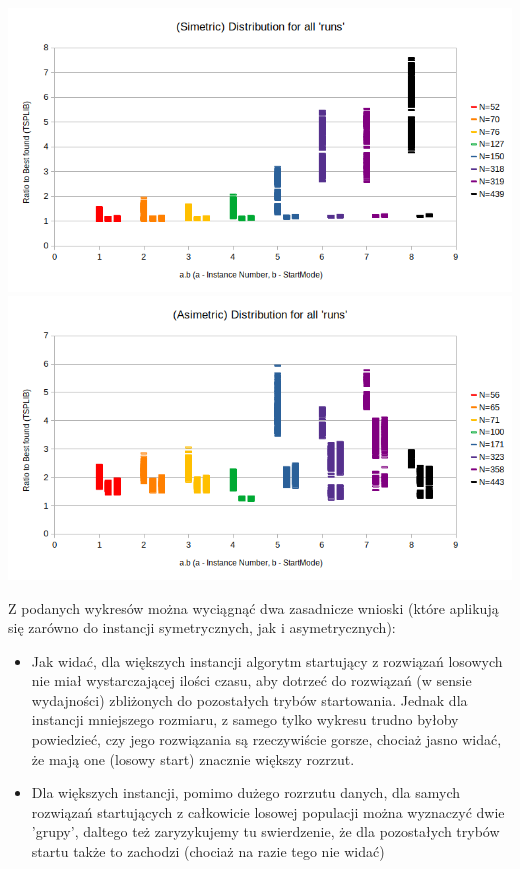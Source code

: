 \documentclass{article}
\begin{document}
\includegraphics[scale=0.36]{simDistI}
\includegraphics[scale=0.36]{asimDistI}

Z podanych wykresów można wyciągnąć dwa zasadnicze wnioski (które aplikują się zarówno do instancji symetrycznych, jak i asymetrycznych):
\begin{itemize}
	\item Jak widać, dla większych instancji algorytm startujący z rozwiązań losowych nie miał wystarczającej ilości czasu, aby dotrzeć do rozwiązań (w sensie wydajności) zbliżonych do pozostałych trybów startowania. Jednak dla instancji mniejszego rozmiaru, z samego tylko wykresu trudno byłoby powiedzieć, czy jego rozwiązania są rzeczywiście gorsze, chociaż  jasno widać, że mają one (losowy start) znacznie większy rozrzut.
	\item Dla większych instancji, pomimo dużego rozrzutu danych, dla samych rozwiązań startujących z całkowicie losowej populacji można wyznaczyć dwie 'grupy', daltego też zaryzykujemy tu swierdzenie, że dla pozostałych trybów startu także to zachodzi (chociaż na razie tego nie widać)
\end{itemize}
\end{document}
